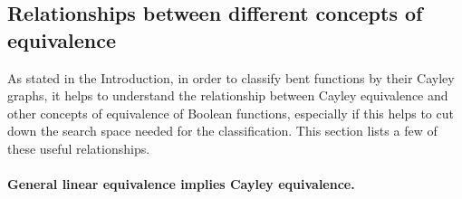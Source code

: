 \subsection{Relationships between different concepts of equivalence}

As stated in the Introduction, in order to classify bent functions by their Cayley graphs,
it helps to understand the relationship between Cayley equivalence and other concepts of equivalence
of Boolean functions, especially if this helps to cut down the search space needed for the classification.
This section lists a few of these useful relationships.


\paragraph*{General linear equivalence implies Cayley equivalence.}

